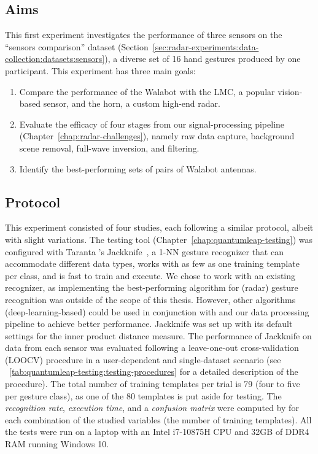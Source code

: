 \subsection{Aims} \label{sec:radar-experiments:sensors:aims}
This first experiment investigates the performance of three sensors on the ``sensors comparison'' dataset (Section~\ref{sec:radar-experiments:data-collection:datasets:sensors}), a diverse set of 16 hand gestures produced by one participant. This experiment has three main goals:
\begin{enumerate}
    \item Compare the performance of the Walabot with the LMC, a popular vision-based sensor, and the horn, a custom high-end radar.
    \item Evaluate the efficacy of four stages from our signal-processing pipeline (Chapter~\ref{chap:radar-challenges}), namely raw data capture, background scene removal, full-wave inversion, and filtering.
    \item Identify the best-performing sets of pairs of Walabot antennas.
\end{enumerate}

\subsection{Protocol} \label{sec:radar-experiments:sensors:protocol}
This experiment consisted of four studies, each following a similar protocol, albeit with slight variations.
%
The \ql testing tool (Chapter~\ref{chap:quantumleap-testing}) was configured with Taranta \etal's Jackknife~\cite{Taranta:2017}, a 1-NN gesture recognizer that can accommodate different data types, works with as few as one training template per class, and is fast to train and execute. We chose to work with an existing recognizer, as implementing the best-performing algorithm for (radar) gesture recognition was outside of the scope of this thesis. However, other algorithms (\eg deep-learning-based) could be used in conjunction with \ql and our data processing pipeline to achieve better performance. Jackknife was set up with its default settings for the inner product distance measure. 
%
The performance of Jackknife on data from each sensor was evaluated following a leave-one-out cross-validation (LOOCV) procedure in a user-dependent and single-dataset scenario (see \tab~\ref{tab:quantumleap-testing:testing-procedures} for a detailed description of the procedure). 
The total number of training templates per trial is 79 (four to five per gesture class), as one of the 80 templates is put aside for testing.
The \textit{recognition rate}, \textit{execution time}, and a \textit{confusion matrix} were computed by \ql for each combination of the studied variables (\eg the number of training templates).
All the tests were run on a laptop with an Intel i7-10875H CPU and 32GB of DDR4 RAM running Windows 10.

